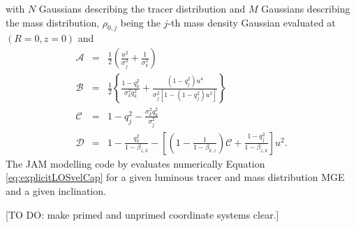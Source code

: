 with $N$ Gaussians describing the tracer distribution and $M$ Gaussians describing the mass distribution, $\rho_{0,j}$ being the $j$-th mass density Gaussian evaluated at $(R=0,z=0)$ and
\begin{eqnarray*}
\mathscr{A} &=& \frac 12 \left(\frac{u^2}{\sigma_j^2} + \frac{1}{\sigma_k^2} \right)\nonumber\\
\mathscr{B} &=& \frac 12 \left\{\frac{1-q^{2}_k}{\sigma_k^2 q^{2}_k} + \frac{(1-q^{2}_j)u^4}{\sigma_j^2 \left[1-(1-{q}_j^{2})u^2 \right]} \right\}\nonumber\\
\mathscr{C} &=& 1- q^{2}_j - \frac{\sigma_k^2 q^{2}_k}{\sigma^2_j}\nonumber\\
\mathscr{D} &=& 1 - \frac{q^{2}_k}{1-\beta_{z,k}} - \left[ \left(1-\frac{1}{1-\beta_{k,z}}\right)\mathscr{C} + \frac{1-q^{2}_j}{1-\beta_{z,k}}\right] u^2.\nonumber
\end{eqnarray*}
The JAM modelling code by \citet{Cap08} evaluates numerically Equation \ref{eq:explicitLOSvelCap} for a given luminous tracer and mass distribution MGE and a given inclination.

[TO DO: make primed and unprimed coordinate systems clear.]


